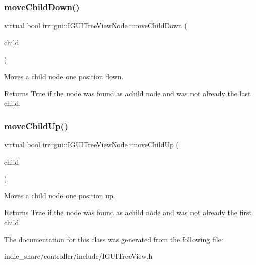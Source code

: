 \subsubsection{\texorpdfstring{move\+Child\+Down()}{moveChildDown()}}
{\footnotesize\ttfamily virtual bool irr\+::gui\+::\+I\+G\+U\+I\+Tree\+View\+Node\+::move\+Child\+Down (\begin{DoxyParamCaption}\item[{\hyperlink{classirr_1_1gui_1_1IGUITreeViewNode}{I\+G\+U\+I\+Tree\+View\+Node} $\ast$}]{child }\end{DoxyParamCaption})\hspace{0.3cm}{\ttfamily [pure virtual]}}



Moves a child node one position down. 

\begin{DoxyReturn}{Returns}
True if the node was found as achild node and was not already the last child. 
\end{DoxyReturn}
\mbox{\label{classirr_1_1gui_1_1IGUITreeViewNode_a9e55b868695250c09e53e5fa961a812c}} 
\subsubsection{\texorpdfstring{move\+Child\+Up()}{moveChildUp()}}
{\footnotesize\ttfamily virtual bool irr\+::gui\+::\+I\+G\+U\+I\+Tree\+View\+Node\+::move\+Child\+Up (\begin{DoxyParamCaption}\item[{\hyperlink{classirr_1_1gui_1_1IGUITreeViewNode}{I\+G\+U\+I\+Tree\+View\+Node} $\ast$}]{child }\end{DoxyParamCaption})\hspace{0.3cm}{\ttfamily [pure virtual]}}



Moves a child node one position up. 

\begin{DoxyReturn}{Returns}
True if the node was found as achild node and was not already the first child. 
\end{DoxyReturn}


The documentation for this class was generated from the following file\+:\begin{DoxyCompactItemize}
\item 
indie\+\_\+share/controller/include/I\+G\+U\+I\+Tree\+View.\+h\end{DoxyCompactItemize}
